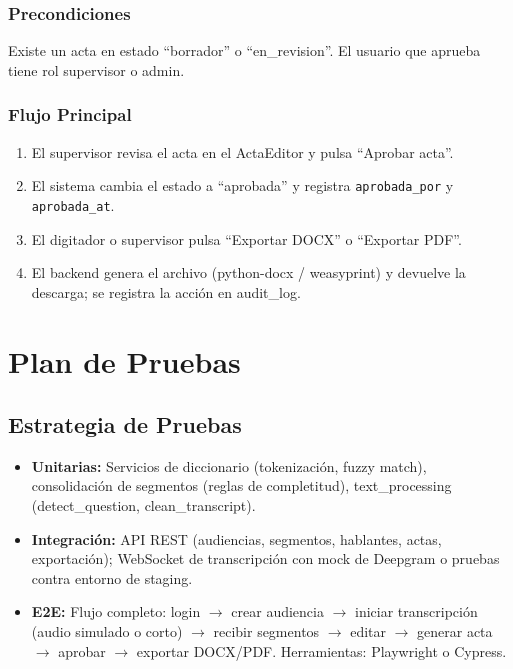 \documentclass[12pt,a4paper]{report}
\begin{document}
\subsection{Precondiciones}

Existe un acta en estado ``borrador'' o ``en\_revision''. El usuario que aprueba tiene rol supervisor o admin.

\subsection{Flujo Principal}

\begin{enumerate}
    \item El supervisor revisa el acta en el ActaEditor y pulsa ``Aprobar acta''.
    \item El sistema cambia el estado a ``aprobada'' y registra \texttt{aprobada\_por} y \texttt{aprobada\_at}.
    \item El digitador o supervisor pulsa ``Exportar DOCX'' o ``Exportar PDF''.
    \item El backend genera el archivo (python-docx / weasyprint) y devuelve la descarga; se registra la acción en audit\_log.
\end{enumerate}

\chapter{Plan de Pruebas}

\section{Estrategia de Pruebas}

\begin{itemize}
    \item \textbf{Unitarias:} Servicios de diccionario (tokenización, fuzzy match), consolidación de segmentos (reglas de completitud), text\_processing (detect\_question, clean\_transcript).
    \item \textbf{Integración:} API REST (audiencias, segmentos, hablantes, actas, exportación); WebSocket de transcripción con mock de Deepgram o pruebas contra entorno de staging.
    \item \textbf{E2E:} Flujo completo: login $\to$ crear audiencia $\to$ iniciar transcripción (audio simulado o corto) $\to$ recibir segmentos $\to$ editar $\to$ generar acta $\to$ aprobar $\to$ exportar DOCX/PDF. Herramientas: Playwright o Cypress.
\end{itemize}
\end{document}
